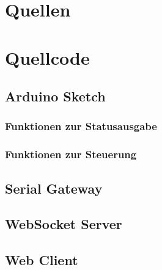 \newpage
\section{Quellen}
\printbibliography[heading=subbibliography,title={Bücher},type=book]
\printbibliography[heading=subbibliography,title={Online},type=online]
\printbibliography[heading=subbibliography,title={Manuals},type=manual]
\printbibliography[heading=subbibliography,title={Software},type=misc]

\newpage
\appendix{}
\section{Quellcode}

\subsection{Arduino Sketch} \label{Arduino Sketch}

\subsubsection{Funktionen zur Statusausgabe}

\subsubsection{Funktionen zur Steuerung}


\newpage
\subsection{Serial Gateway} \label{Serial Gateway}


\newpage
\subsection{WebSocket Server} \label{WebSocket Server}


\newpage
\subsection{Web Client} \label{Web Client}


